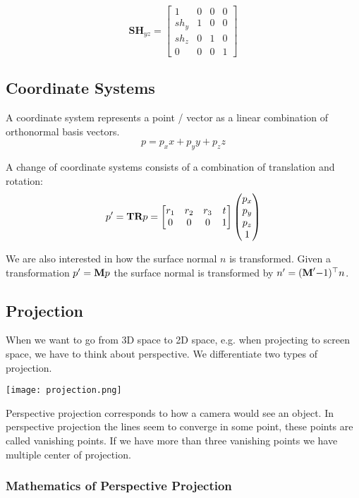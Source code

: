 \begin{itemize}
	$$\textbf{SH}_{yz} = \begin{bmatrix}
		1 & 0 & 0 & 0\\ sh_y & 1 & 0 & 0 \\ sh_z & 0 & 1 & 0 \\ 0 & 0 & 0 & 1
	\end{bmatrix}$$
\end{itemize}


\subsection{Coordinate Systems}

A coordinate system represents a point / vector as a linear combination of orthonormal basis vectors.
$$p = p_x x + p_y y + p_z z$$

A change of coordinate systems consists of a combination of translation and rotation:
$$p' = \textbf T \textbf R p = \begin{bmatrix}
	r_1 & r_2 & r_3 & t \\
	0 & 0 & 0 & 1
\end{bmatrix} \begin{pmatrix}
	p_x \\ p_y \\ p_z \\ 1
\end{pmatrix}$$

We are also interested in how the surface normal $n$ is transformed. Given a transformation $p' = \textbf M p$ the surface normal is transformed by $n' = (\textbf M'{-1})^\top n$.


\subsection{Projection}

When we want to go from 3D space to 2D space, e.g. when projecting to screen space, we have to think about perspective. We differentiate two types of projection.
\begin{center}
	\texttt{[image: projection.png]}
\end{center}

Perspective projection corresponds to how a camera would see an object. In perspective projection the lines seem to converge in some point, these points are called vanishing points. If we have more than three vanishing points we have multiple center of projection.

\subsubsection{Mathematics of Perspective Projection}

